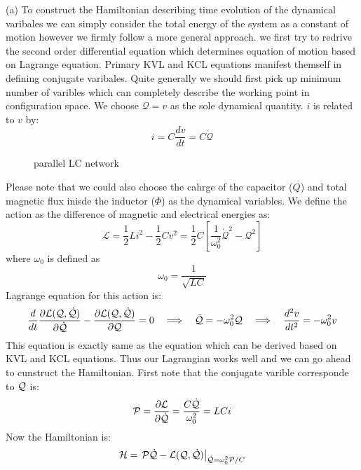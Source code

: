 \begin{homeworkProblem}

\begin{homeworkSection}{(a)}
To construct the Hamiltonian describing time evolution of the dynamical varibales we can simply consider the total energy of the system as a constant of motion however we firmly follow a more general approach. we first try to redrive the second order differential equation which determines equation of motion based on Lagrange equation. Primary KVL and KCL equations manifest themself in defining conjugate varibales. Quite generally we should first pick up minimum number of varibles which can completely describe the working point in configuration space. We choose $\mathcal{Q}=v$ as the sole dynamical quantity. $i$ is related to $v$ by:
\begin{equation}
i=C\frac{dv}{dt}=C\dot{\mathcal{Q}}
\end{equation}
\begin{figure}[!h]
\centering

\caption{\small parallel LC network}
\end{figure}
Please note that we could also choose the cahrge of the capacitor ($Q$) and total magnetic flux inisde the inductor ($\Phi$) as the dynamical variables. We define the action as the difference of magnetic and electrical energies as:
\begin{equation}
\mathcal{L}=\frac{1}{2}Li^2-\frac{1}{2}Cv^2=\frac{1}{2}C\left[\frac{1}{\omega_0^2}\dot{\mathcal{Q}}^2-\mathcal{Q}^2\right]
\end{equation}  
where $\omega_0$ is defined as 
$$\omega_0=\frac{1}{\sqrt{LC}}$$
Lagrange equation for this action is:
\begin{equation}
\frac{d}{dt}\dfrac{\partial \mathcal{L}(\mathcal{Q},\dot{\mathcal{Q}})}{\partial \dot{\mathcal{Q}}}-\dfrac{\partial \mathcal{L}(\mathcal{Q},\dot{\mathcal{Q}})}{\partial \mathcal{Q}}=0\quad\Longrightarrow\quad \ddot{\mathcal{Q}}=-\omega_0^2\mathcal{Q}\quad\Longrightarrow\quad \frac{d^2v}{dt^2}=-\omega_0^2 v
\end{equation}
This equation is exactly same as the equation which can be derived based on KVL and KCL equations. Thus our Lagrangian works well and we can go ahead to cunstruct the Hamiltonian. First note that the conjugate varible corresponde to  $\mathcal{Q}$ is:
\begin{equation}
\mathcal{P}=\dfrac{\partial \mathcal{L}}{\partial \dot{\mathcal{Q}}}=\frac{C\dot{\mathcal{Q}}}{\omega_0^2}=LC i
\end{equation}
Now the Hamiltonian is:
\begin{equation}\label{P1-H}
\M{H}=\left.\M{P}\dot{\M{Q}}-\M{L}(\M{Q},\dot{\M{Q}})\right|_{\dot{\M{Q}}=\omega_0^2\M{P}/C}

\end{equation}
\end{homeworkSection}
\end{homeworkProblem}
